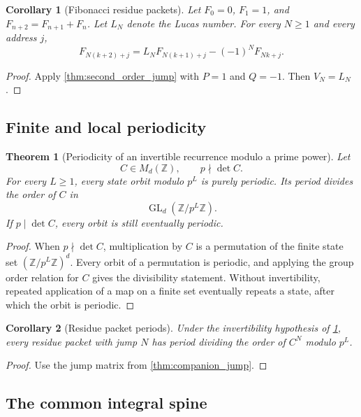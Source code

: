 \documentclass{aomart}
\newtheorem{theorem}{Theorem}[section]
\newtheorem{corollary}[corollary]{Corollary}
\theoremstyle{definition}
\theoremstyle{remark}
\newcommand{\ZZ}{\mathbb Z}
\begin{document}
\begin{corollary}[Fibonacci residue packets]\label{cor:fibonacci_packets}
Let \(F_0=0\), \(F_1=1\), and \(F_{n+2}=F_{n+1}+F_n\). Let \(L_N\) denote the Lucas number. For every \(N\geq1\) and every address \(j\),
\[
\boxed{
F_{N(k+2)+j}
=
L_NF_{N(k+1)+j}
-(-1)^NF_{Nk+j}.
}
\]
\end{corollary}

\begin{proof}
Apply \cref{thm:second_order_jump} with \(P=1\) and \(Q=-1\). Then \(V_N=L_N\).
\end{proof}

\subsection{Finite and local periodicity}

\begin{theorem}[Periodicity of an invertible recurrence modulo a prime power]\label{thm:recurrence_periodicity}
Let
\[
C\in M_d(\ZZ),
\qquad
p\nmid\det C.
\]
For every \(L\geq1\), every state orbit modulo \(p^L\) is purely periodic. Its period divides the order of \(C\) in
\[
\operatorname{GL}_d(\ZZ/p^L\ZZ).
\]
If \(p\mid\det C\), every orbit is still eventually periodic.
\end{theorem}

\begin{proof}
When \(p\nmid\det C\), multiplication by \(C\) is a permutation of the finite state set \((\ZZ/p^L\ZZ)^d\). Every orbit of a permutation is periodic, and applying the group order relation for \(C\) gives the divisibility statement. Without invertibility, repeated application of a map on a finite set eventually repeats a state, after which the orbit is periodic.
\end{proof}

\begin{corollary}[Residue packet periods]\label{cor:residue_packet_periods}
Under the invertibility hypothesis of \cref{thm:recurrence_periodicity}, every residue packet with jump \(N\) has period dividing the order of \(C^N\) modulo \(p^L\).
\end{corollary}

\begin{proof}
Use the jump matrix from \cref{thm:companion_jump}.
\end{proof}

\subsection{The common integral spine}
\end{document}
